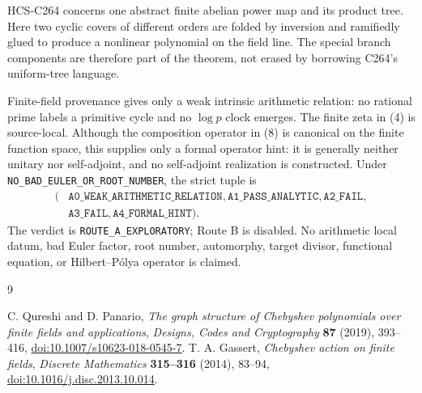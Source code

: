 \documentclass[10pt]{article}
\begin{document}
HCS-C264 concerns one abstract finite abelian power map and its product
tree.  Here two cyclic covers of different orders are folded by inversion
and ramifiedly glued to produce a nonlinear polynomial on the field line.
The special branch components are therefore part of the theorem, not erased
by borrowing C264's uniform-tree language.

Finite-field provenance gives only a weak intrinsic arithmetic relation: no
rational prime labels a primitive cycle and no $\log p$ clock emerges.  The
finite zeta in (4) is source-local.  Although the composition operator in
(8) is canonical on the finite function space, this supplies only a formal
operator hint: it is generally neither unitary nor self-adjoint, and no
self-adjoint realization is constructed.  Under
\texttt{NO\_BAD\_EULER\_OR\_ROOT\_NUMBER}, the strict tuple is
\[
\begin{split}
(&\texttt{A0\_WEAK\_ARITHMETIC\_RELATION},
\texttt{A1\_PASS\_ANALYTIC},\texttt{A2\_FAIL},\\
&\texttt{A3\_FAIL},\texttt{A4\_FORMAL\_HINT}).
\end{split}
\]
The verdict is \texttt{ROUTE\_A\_EXPLORATORY}; Route B is disabled.  No
arithmetic local datum, bad Euler factor, root number, automorphy, target
divisor, functional equation, or Hilbert--P\'olya operator is claimed.
\fi

\begin{sloppypar}
\begin{thebibliography}{9}
\raggedright
{} C. Qureshi and D. Panario,
\emph{The graph structure of Chebyshev polynomials over finite fields and applications},
\emph{Designs, Codes and Cryptography} \textbf{87} (2019), 393--416,
\href{https://doi.org/10.1007/s10623-018-0545-7}{doi:10.1007/s10623-018-0545-7}.
 T. A. Gassert,
\emph{Chebyshev action on finite fields},
\emph{Discrete Mathematics} \textbf{315--316} (2014), 83--94,
\href{https://doi.org/10.1016/j.disc.2013.10.014}{doi:10.1016/j.disc.2013.10.014}.
\end{thebibliography}
\end{sloppypar}
\end{document}
